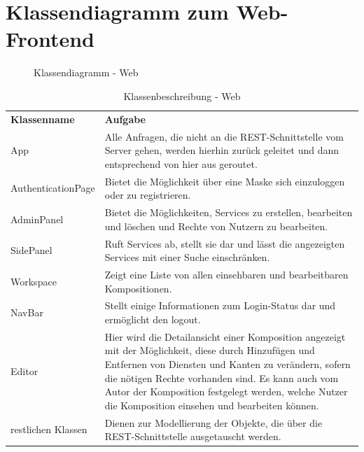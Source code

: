 \section*{Klassendiagramm zum Web-Frontend}

\begin{figure}[h]
	\centering
	\caption{Klassendiagramm - Web}
	\label{fig:klassendiagramm-web}
\end{figure}

\begin{table}[h]
	\centering
	\begin{tabularx}{\textwidth}{X X}
		\rowcolor[HTML]{C0C0C0} 
		\textbf{Klassenname} & \textbf{Aufgabe} \\
		App & Alle Anfragen, die nicht an die REST-Schnittstelle vom Server gehen, werden hierhin zurück geleitet
		und dann entsprechend von hier aus geroutet. \\
		\rowcolor[HTML]{E7E7E7} 
		AuthenticationPage & Bietet die Möglichkeit über eine Maske sich einzuloggen oder zu registrieren. \\
		AdminPanel & Bietet die Möglichkeiten, Services zu erstellen, bearbeiten und löschen und Rechte von Nutzern zu bearbeiten. \\
		\rowcolor[HTML]{E7E7E7} 
		SidePanel & Ruft Services ab, stellt sie dar und lässt die angezeigten Services mit einer Suche einschränken. \\
		Workspace & Zeigt eine Liste von allen einsehbaren und bearbeitbaren Kompositionen. \\
		\rowcolor[HTML]{E7E7E7} 
		NavBar & Stellt einige Informationen zum Login-Status dar und ermöglicht den logout. \\
		Editor & Hier wird die Detailansicht einer Komposition angezeigt mit der Möglichkeit, diese durch Hinzufügen und Entfernen von
		Diensten und Kanten zu verändern, sofern die nötigen Rechte vorhanden sind. Es kann auch vom Autor der Komposition festgelegt
		werden, welche Nutzer die Komposition einsehen und bearbeiten können. \\
		\rowcolor[HTML]{E7E7E7} 
		restlichen Klassen & Dienen zur Modellierung der Objekte, die über die REST-Schnittstelle ausgetauscht werden. 
	\end{tabularx}
	\caption{Klassenbeschreibung - Web}
	\label{table:klassenbeschreibung-web}
\end{table}
